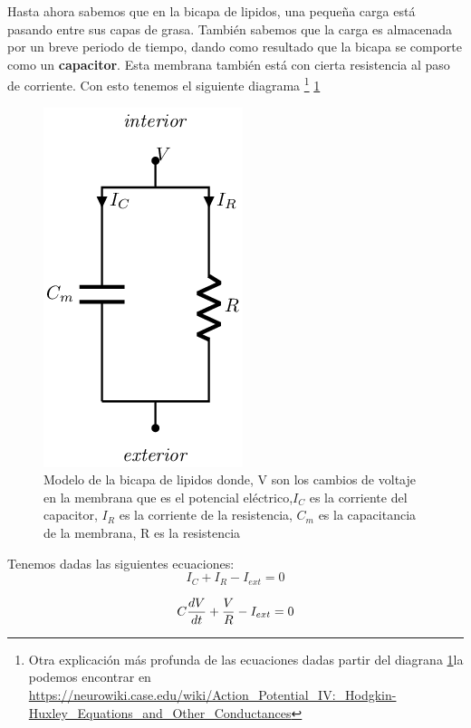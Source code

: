 Hasta ahora sabemos que en la bicapa de lipidos, una pequeña carga está pasando entre sus capas de grasa. También sabemos que la carga es almacenada por un breve periodo de tiempo, dando como resultado que la bicapa se comporte como un \textbf{capacitor}. Esta membrana también está con cierta resistencia al paso de corriente. Con esto tenemos el siguiente diagrama \footnote{Otra explicación más profunda de las ecuaciones dadas partir del diagrana \ref{fig:circuitoP}la podemos encontrar en \url{https://neurowiki.case.edu/wiki/Action_Potential_IV:_Hodgkin-Huxley_Equations_and_Other_Conductances}} \ref{fig:circuitoP}

\begin{figure}[h]
 \centering
 \includegraphics[scale=0.5]{../Figuras/bicapaLipidos.png}
 \caption{Modelo de la bicapa de lipidos donde, V son los cambios de voltaje en la membrana que es el potencial eléctrico,\(I_{C}\) es la corriente del capacitor, \(I_{R}\) es la corriente de la resistencia, \(C_{m}\) es la capacitancia de la membrana, R es la resistencia}
 \label{fig:circuitoP}
\end{figure}

Tenemos dadas las siguientes ecuaciones:
\begin{equation}
    I_{C} + I_{R} - I_{ext} = 0
  \label{eq:bicapa1}
\end{equation}

\begin{equation}
    C\dfrac{dV}{dt} + \dfrac{V}{R} - I_{ext} = 0 \\
  \label{eq:bicapa2}
\end{equation}

